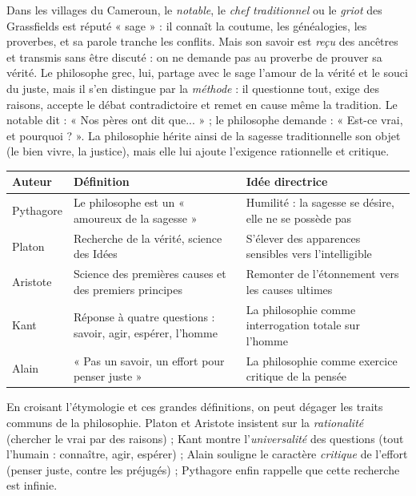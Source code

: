 \documentclass[11pt]{article}
\newcounter{popsec}
\newcounter{popsub}
\newcommand{\courssub}[1]{%
  \stepcounter{popsub}%
  \par\vspace{9pt}\noindent{\popxbold\fontsize{11.5}{13}\selectfont\color{popink}{\color{poporange}\thepopsec.\thepopsub}\hspace{6pt}#1}\par\nopagebreak\vspace{4pt}
}
\begin{document}
\begin{exemplebox}
Dans les villages du Cameroun, le \emph{notable}, le \emph{chef traditionnel} ou le \emph{griot} des Grassfields est réputé « sage » : il connaît la coutume, les généalogies, les proverbes, et sa parole tranche les conflits. Mais son savoir est \emph{reçu} des ancêtres et transmis sans être discuté : on ne demande pas au proverbe de prouver sa vérité. Le philosophe grec, lui, partage avec le sage l'amour de la vérité et le souci du juste, mais il s'en distingue par la \emph{méthode} : il questionne tout, exige des raisons, accepte le débat contradictoire et remet en cause même la tradition. Le notable dit : « Nos pères ont dit que... » ; le philosophe demande : « Est-ce vrai, et pourquoi ? ». La philosophie hérite ainsi de la sagesse traditionnelle son objet (le bien vivre, la justice), mais elle lui ajoute l'exigence rationnelle et critique.
\end{exemplebox}

\begin{center}
\begin{tabularx}{\linewidth}{|l|X|X|}\hline
\rowcolor{popblueL} \textbf{Auteur} & \textbf{Définition} & \textbf{Idée directrice} \\ \hline
Pythagore & Le philosophe est un « amoureux de la sagesse » & Humilité : la sagesse se désire, elle ne se possède pas \\ \hline
Platon & Recherche de la vérité, science des Idées & S'élever des apparences sensibles vers l'intelligible \\ \hline
Aristote & Science des premières causes et des premiers principes & Remonter de l'étonnement vers les causes ultimes \\ \hline
Kant & Réponse à quatre questions : savoir, agir, espérer, l'homme & La philosophie comme interrogation totale sur l'homme \\ \hline
Alain & « Pas un savoir, un effort pour penser juste » & La philosophie comme exercice critique de la pensée \\ \hline
\end{tabularx}
\end{center}

\courssub{Définition synthétique}

En croisant l'étymologie et ces grandes définitions, on peut dégager les traits communs de la philosophie. Platon et Aristote insistent sur la \emph{rationalité} (chercher le vrai par des raisons) ; Kant montre l'\emph{universalité} des questions (tout l'humain : connaître, agir, espérer) ; Alain souligne le caractère \emph{critique} de l'effort (penser juste, contre les préjugés) ; Pythagore enfin rappelle que cette recherche est infinie.
\end{document}

